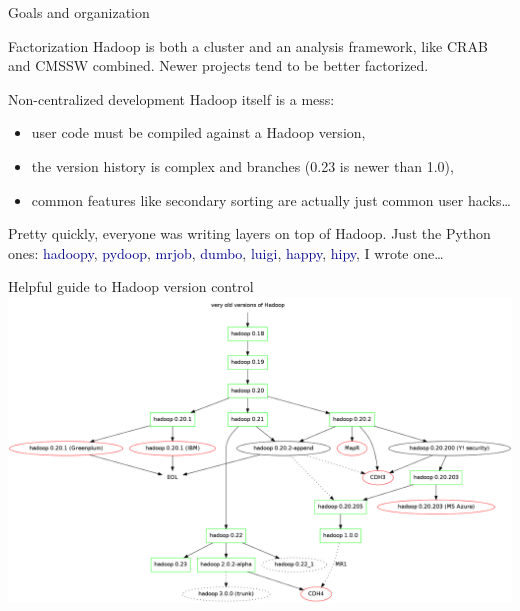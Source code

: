\documentclass{beamer}
\begin{document}
\begin{frame}{Goals and organization}

\begin{block}{Factorization}
Hadoop is both a cluster and an analysis framework, like CRAB and CMSSW combined. Newer projects tend to be better factorized.
\end{block}

\begin{block}{Non-centralized development}
Hadoop itself is a mess:
\begin{itemize}
\item user code must be compiled against a Hadoop version,
\item the version history is complex and branches (0.23 is newer than 1.0),
\item common features like secondary sorting are actually just common user hacks\ldots
\end{itemize}

\vspace{0.2 cm}
Pretty quickly, everyone was writing layers on top of Hadoop. Just the Python ones: \textcolor{darkblue}{hadoopy}, \textcolor{darkblue}{pydoop}, \textcolor{darkblue}{mrjob}, \textcolor{darkblue}{dumbo}, \textcolor{darkblue}{luigi}, \textcolor{darkblue}{happy}, \textcolor{darkblue}{hipy}, I wrote one\ldots
\end{block}
\end{frame}

\begin{frame}{Helpful guide to Hadoop version control}
\includegraphics[width=\linewidth]{hadoop_versions.png}
\end{frame}
\end{document}

